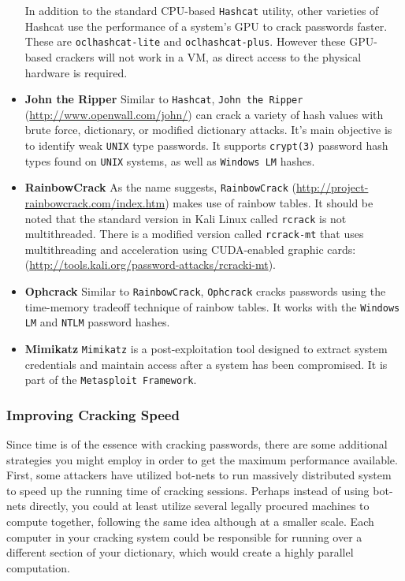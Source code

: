 \begin{itemize}
\begin{itemize}
  \end{itemize}
  In addition to the standard CPU-based \verb|Hashcat| utility, other varieties of Hashcat use the performance of a system’s GPU to crack passwords faster. These are \verb|oclhashcat-lite| and \verb|oclhashcat-plus|. However these GPU-based crackers will not work in a VM, as direct access to the physical hardware is required.

  \item \textbf{John the Ripper}
  Similar to \verb|Hashcat|, \verb|John the Ripper| (\url{http://www.openwall.com/john/}) can crack a variety of hash values with brute force, dictionary, or modified dictionary attacks. It’s main objective is to identify weak \verb|UNIX| type passwords. It supports \verb|crypt(3)| password hash types found on \verb|UNIX| systems, as well as \verb|Windows LM| hashes.

  \item \textbf{RainbowCrack}
  As the name suggests, \verb|RainbowCrack| (\url{http://project-rainbowcrack.com/index.htm}) makes use of rainbow tables. It should be noted that the standard version in Kali Linux called \verb|rcrack| is not multithreaded. There is a modified version called \verb|rcrack-mt| that uses multithreading and acceleration using CUDA-enabled graphic cards: (\url{http://tools.kali.org/password-attacks/rcracki-mt}).

  \item \textbf{Ophcrack}
  Similar to \verb|RainbowCrack|, \verb|Ophcrack| cracks passwords using the time-memory tradeoff technique of rainbow tables. It works with the \verb|Windows LM| and \verb|NTLM| password hashes.

  \item \textbf{Mimikatz}
  \verb|Mimikatz| is a post-exploitation tool designed to extract system credentials and maintain access after a system has been compromised. It is part of the \verb|Metasploit Framework|.

\end{itemize}

\subsubsection{Improving Cracking Speed}

  Since time is of the essence with cracking passwords, there are some additional strategies you might employ in order to get the maximum performance available. First, some attackers have utilized bot-nets to run massively distributed system to speed up the running time of cracking sessions. Perhaps instead of using bot-nets directly, you could at least utilize several legally procured machines to compute together, following the same idea although at a smaller scale. Each computer in your cracking system could be responsible for running over a different section of your dictionary, which would create a highly parallel computation.

